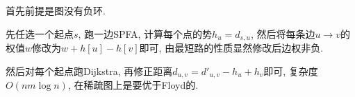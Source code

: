 首先前提是图没有负环.

先任选一个起点$s$, 跑一边SPFA, 计算每个点的势$h_u = d_{s, u}$, 然后将每条边$u\to v$的权值$w$修改为$w + h[u] - h[v]$即可, 由最短路的性质显然修改后边权非负.

然后对每个起点跑Dijkstra, 再修正距离$d_{u, v} = d'_{u, v} - h_u + h_v$即可, 复杂度$O(nm\log n)$, 在稀疏图上是要优于Floyd的.